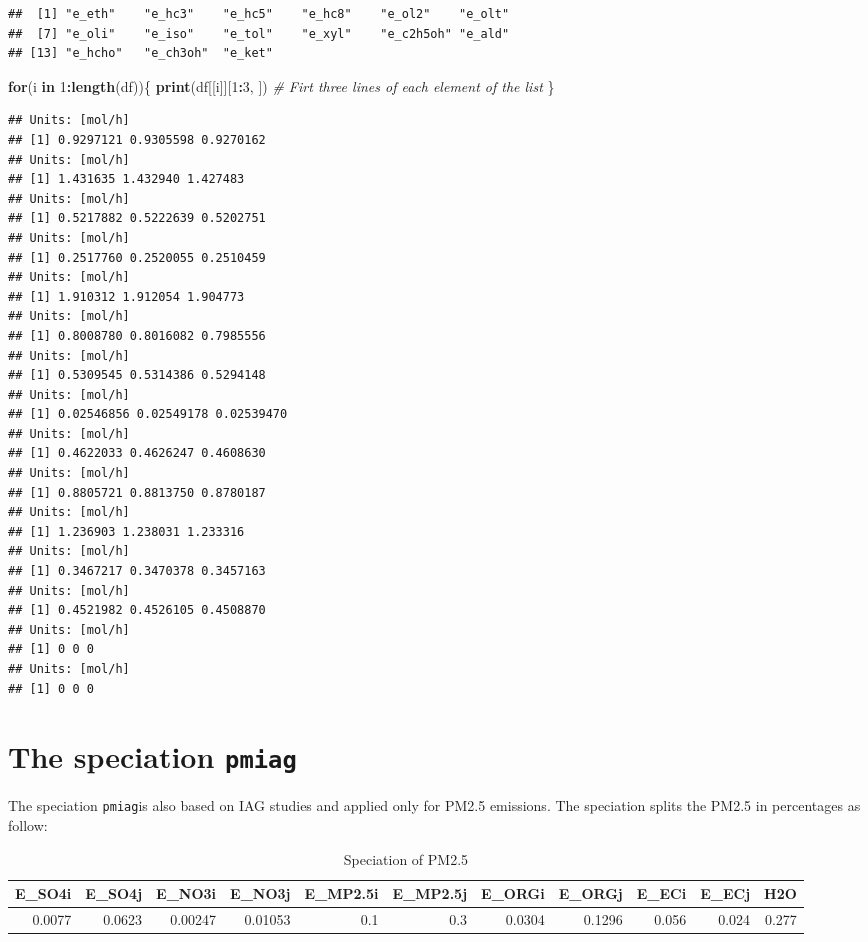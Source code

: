 \documentclass[12pt,graybox,envcountchap,sectrefs]{krantz}
\makeatletter
\newenvironment{Shaded}{\begin{snugshade}}{\end{snugshade}}
\newcommand{\KeywordTok}[1]{\textcolor[rgb]{0.13,0.29,0.53}{\textbf{#1}}}
\newcommand{\DecValTok}[1]{\textcolor[rgb]{0.00,0.00,0.81}{#1}}
\newcommand{\CommentTok}[1]{\textcolor[rgb]{0.56,0.35,0.01}{\textit{#1}}}
\newcommand{\ControlFlowTok}[1]{\textcolor[rgb]{0.13,0.29,0.53}{\textbf{#1}}}
\newcommand{\OperatorTok}[1]{\textcolor[rgb]{0.81,0.36,0.00}{\textbf{#1}}}
\newcommand{\NormalTok}[1]{#1}
\newenvironment{kframe}{%
\medskip{}
\setlength{\fboxsep}{.8em}
 \def\at@end@of@kframe{}%
 \ifinner\ifhmode%
  \def\at@end@of@kframe{\end{minipage}}%
  \begin{minipage}{\columnwidth}%
 \fi\fi%
 \def\FrameCommand##1{\hskip\@totalleftmargin \hskip-\fboxsep
 \colorbox{shadecolor}{##1}\hskip-\fboxsep
     \hskip-\linewidth \hskip-\@totalleftmargin \hskip\columnwidth}%
 \MakeFramed {\advance\hsize-\width
   \@totalleftmargin\z@ \linewidth\hsize
   \@setminipage}}%
 {\par\unskip\endMakeFramed%
 \at@end@of@kframe}
\renewenvironment{Shaded}{\begin{kframe}}{\end{kframe}}
\theoremstyle{definition}
\theoremstyle{definition}
\theoremstyle{definition}
\theoremstyle{remark}
\makeatother
\begin{document}
\begin{verbatim}
##  [1] "e_eth"    "e_hc3"    "e_hc5"    "e_hc8"    "e_ol2"    "e_olt"   
##  [7] "e_oli"    "e_iso"    "e_tol"    "e_xyl"    "e_c2h5oh" "e_ald"   
## [13] "e_hcho"   "e_ch3oh"  "e_ket"
\end{verbatim}

\begin{Shaded}
\begin{Highlighting}[]
\ControlFlowTok{for}\NormalTok{(i }\ControlFlowTok{in} \DecValTok{1}\OperatorTok{:}\KeywordTok{length}\NormalTok{(df))\{}
  \KeywordTok{print}\NormalTok{(df[[i]][}\DecValTok{1}\OperatorTok{:}\DecValTok{3}\NormalTok{, ]) }\CommentTok{# Firt three lines of each element of the list}
\NormalTok{\}}
\end{Highlighting}
\end{Shaded}

\begin{verbatim}
## Units: [mol/h]
## [1] 0.9297121 0.9305598 0.9270162
## Units: [mol/h]
## [1] 1.431635 1.432940 1.427483
## Units: [mol/h]
## [1] 0.5217882 0.5222639 0.5202751
## Units: [mol/h]
## [1] 0.2517760 0.2520055 0.2510459
## Units: [mol/h]
## [1] 1.910312 1.912054 1.904773
## Units: [mol/h]
## [1] 0.8008780 0.8016082 0.7985556
## Units: [mol/h]
## [1] 0.5309545 0.5314386 0.5294148
## Units: [mol/h]
## [1] 0.02546856 0.02549178 0.02539470
## Units: [mol/h]
## [1] 0.4622033 0.4626247 0.4608630
## Units: [mol/h]
## [1] 0.8805721 0.8813750 0.8780187
## Units: [mol/h]
## [1] 1.236903 1.238031 1.233316
## Units: [mol/h]
## [1] 0.3467217 0.3470378 0.3457163
## Units: [mol/h]
## [1] 0.4521982 0.4526105 0.4508870
## Units: [mol/h]
## [1] 0 0 0
## Units: [mol/h]
## [1] 0 0 0
\end{verbatim}

\section{\texorpdfstring{The speciation
\texttt{pmiag}}{The speciation pmiag}}\label{the-speciation-pmiag}

The speciation \texttt{pmiag}is also based on IAG studies and applied
only for PM2.5 emissions. The speciation splits the PM2.5 in percentages
as follow:

\begin{table}

\caption{\label{tab:unnamed-chunk-93}Speciation of PM2.5}
\centering
\begin{tabular}[t]{r|r|r|r|r|r|r|r|r|r|r}
\hline
E\_SO4i & E\_SO4j & E\_NO3i & E\_NO3j & E\_MP2.5i & E\_MP2.5j & E\_ORGi & E\_ORGj & E\_ECi & E\_ECj & H2O\\
\hline
0.0077 & 0.0623 & 0.00247 & 0.01053 & 0.1 & 0.3 & 0.0304 & 0.1296 & 0.056 & 0.024 & 0.277\\
\hline
\end{tabular}
\end{table}
\end{document}
